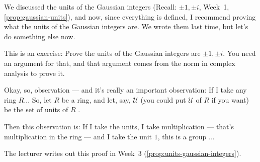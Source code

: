 \begin{speech}[00:28:16 - 00:29:52]
We discussed the units of the Gaussian integers (Recall: $\pm 1, \pm i$, Week~1, \cref{prop:gaussian-units}), and now, since everything is defined, I recommend proving what the units of the Gaussian integers are. We wrote them last time, but let's do something else now. 

This is an exercise: Prove the units of the Gaussian integers are $\pm 1, \pm i$. You need an argument for that, and that argument comes from the norm in complex analysis to prove it.

Okay, so, observation  --- and it's really an important observation: If I take any ring $R$... So, let $R$ be a ring, and let, say, $\mathcal{U}$ (you could put $\mathcal{U}$ of $R$ if you want) be the set of units of $R$ .

Then this observation is: If I take the units, I take multiplication --- that's multiplication in the ring --- and I take the unit $1$, this is a group ...
\end{speech}

\begin{content}

The lecturer writes out this proof in Week~3 (\cref{prop:units-gaussian-integers}).

\end{content}

